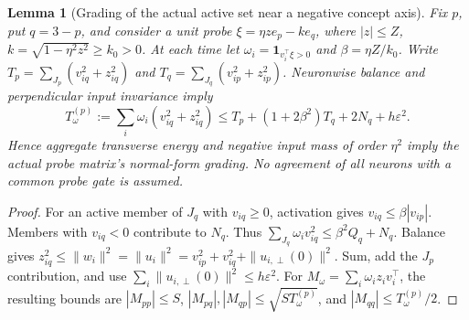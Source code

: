 \documentclass{article} %
\theoremstyle{plain}
\newtheorem{lemma}[theorem]{Lemma}
\theoremstyle{definition}
\theoremstyle{remark}
\begin{document}
\begin{lemma}[Grading of the actual active set near a negative concept axis]
\label{sbsign:probe}
Fix $p$, put $q=3-p$, and consider a unit probe
$\xi=\eta z e_p-k e_q$, where $|z|\le Z$,
$k=\sqrt{1-\eta^2z^2}\ge k_0>0$.
At each time let $\omega_i=\mathbf1_{v_i^\top\xi>0}$ and
$\beta=\eta Z/k_0$. Write
$T_p=\sum_{J_p}(v_{iq}^2+z_{iq}^2)$ and
$T_q=\sum_{J_q}(v_{ip}^2+z_{ip}^2)$.
Neuronwise balance and perpendicular input invariance imply
\begin{equation}\label{sbsign:probe-energy}
 T_\omega^{(p)}:=\sum_i\omega_i(v_{iq}^2+z_{iq}^2)
 \le T_p+(1+2\beta^2)T_q+2N_q+h\varepsilon^2.
\end{equation}
Hence aggregate transverse energy and negative input mass of order
$\eta^2$ imply the actual probe matrix's normal-form grading.
No agreement of all neurons with a common probe gate is assumed.
\end{lemma}
\begin{proof}
For an active member of $J_q$ with $v_{iq}\ge0$, activation gives
$v_{iq}\le\beta|v_{ip}|$. Members with $v_{iq}<0$ contribute to $N_q$.
Thus $\sum_{J_q}\omega_i v_{iq}^2\le\beta^2Q_q+N_q$.
Balance gives $z_{iq}^2\le\|w_i\|^2=\|u_i\|^2
=v_{ip}^2+v_{iq}^2+\|u_{i,\perp}(0)\|^2$.
Sum, add the $J_p$ contribution, and use
$\sum_i\|u_{i,\perp}(0)\|^2\le h\varepsilon^2$.
For $M_\omega=\sum_i\omega_i z_iv_i^\top$, the resulting bounds are
$|M_{pp}|\le S$, $|M_{pq}|,|M_{qp}|\le\sqrt{S T_\omega^{(p)}}$,
and $|M_{qq}|\le T_\omega^{(p)}/2$.
\end{proof}
\end{document}
